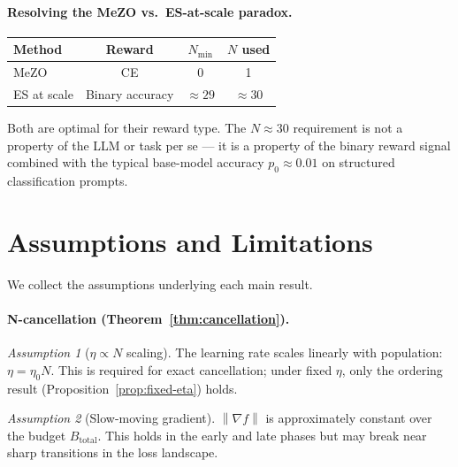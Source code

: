 \documentclass[11pt]{article}
\theoremstyle{definition}
\theoremstyle{remark}
\newtheorem{assumption}{Assumption}
\newcommand{\norm}[1]{\left\|#1\right\|}
\newcommand{\Nmin}{N_{\mathrm{min}}}
\begin{document}
\paragraph{Resolving the MeZO vs.\ ES-at-scale paradox.}
\begin{center}
\begin{tabular}{lccc}
\toprule
Method & Reward & $\Nmin$ & $N$ used\\
\midrule
MeZO \citep{malladi2023mezo} & CE & 0 & 1\\
ES at scale \citep{qiu2025esscale} & Binary accuracy & $\approx 29$ & $\approx 30$\\
\bottomrule
\end{tabular}
\end{center}

Both are optimal for their reward type. The $N \approx 30$ requirement is not a property of the LLM or task per se --- it is a property of the binary reward signal combined with the typical base-model accuracy $p_0 \approx 0.01$ on structured classification prompts.

\section{Assumptions and Limitations}
\label{sec:assumptions}

We collect the assumptions underlying each main result.

\paragraph{N-cancellation (Theorem~\ref{thm:cancellation}).}
\begin{assumption}[$\eta \propto N$ scaling]
The learning rate scales linearly with population: $\eta = \eta_0 N$. This is required for exact cancellation; under fixed $\eta$, only the ordering result (Proposition~\ref{prop:fixed-eta}) holds.
\end{assumption}
\begin{assumption}[Slow-moving gradient]
$\norm{\nabla f}$ is approximately constant over the budget $B_{\mathrm{total}}$. This holds in the early and late phases but may break near sharp transitions in the loss landscape.
\end{assumption}
\end{document}
